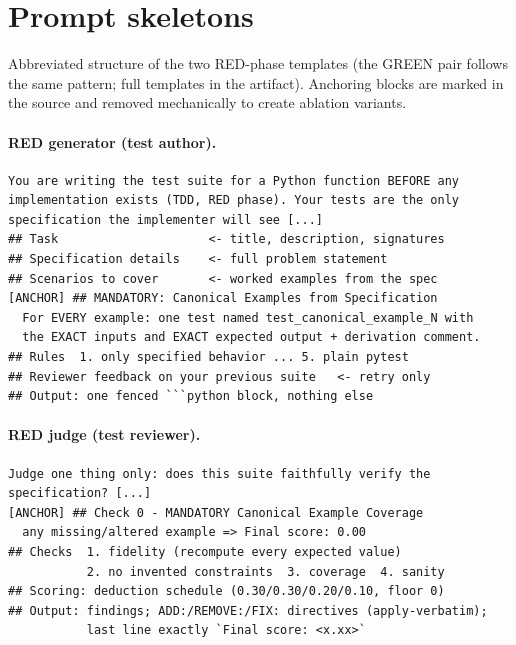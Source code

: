 \section{Prompt skeletons}
\label{app:prompts}

Abbreviated structure of the two RED-phase templates (the GREEN pair follows the same
pattern; full templates in the artifact). Anchoring blocks are marked in the source and
removed mechanically to create ablation variants.

\paragraph{RED generator (test author).}
\begin{small}
\begin{Verbatim}[breaklines,breakanywhere]
You are writing the test suite for a Python function BEFORE any
implementation exists (TDD, RED phase). Your tests are the only
specification the implementer will see [...]
## Task                     <- title, description, signatures
## Specification details    <- full problem statement
## Scenarios to cover       <- worked examples from the spec
[ANCHOR] ## MANDATORY: Canonical Examples from Specification
  For EVERY example: one test named test_canonical_example_N with
  the EXACT inputs and EXACT expected output + derivation comment.
## Rules  1. only specified behavior ... 5. plain pytest
## Reviewer feedback on your previous suite   <- retry only
## Output: one fenced ```python block, nothing else
\end{Verbatim}
\end{small}

\paragraph{RED judge (test reviewer).}
\begin{small}
\begin{Verbatim}[breaklines,breakanywhere]
Judge one thing only: does this suite faithfully verify the
specification? [...]
[ANCHOR] ## Check 0 - MANDATORY Canonical Example Coverage
  any missing/altered example => Final score: 0.00
## Checks  1. fidelity (recompute every expected value)
           2. no invented constraints  3. coverage  4. sanity
## Scoring: deduction schedule (0.30/0.30/0.20/0.10, floor 0)
## Output: findings; ADD:/REMOVE:/FIX: directives (apply-verbatim);
           last line exactly `Final score: <x.xx>`
\end{Verbatim}
\end{small}

